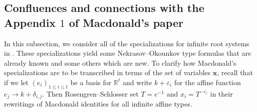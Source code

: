 \documentclass[11pt,letterpaper]{amsart}
\def\det{{\rm det}}
\numberwithin{equation}{section}
\numberwithin{df}{section}
\begin{document}
%
%
%
%
%

\subsection{Confluences and connections with the Appendix $1$ of Macdonald's paper}\label{sec:macident}

In this subsection, we consider all of the specializations for infinite root systems in \cite[Appendix $1$]{Mac}. These specializations yield some Nekrasov--Okounkov type formulas that are already known and some others which are new. To clarify how Macdonald's specializations are to be transcribed in terms of the set of variables $\mathbf{x}$, recall that if we let $(e_i)_{1\leq i\leq t}$ be a basis for $\mathbb{R}^t$ and write $k+\varepsilon_i$ for the affine function $e_j\to k+\delta_{i,j}$. Then Rosengren--Schlosser set $T=e^{-1}$ and $x_i=T^{-\varepsilon_i}$ in their rewritings of Macdonald identities for all infinite affine types.
\end{document}
